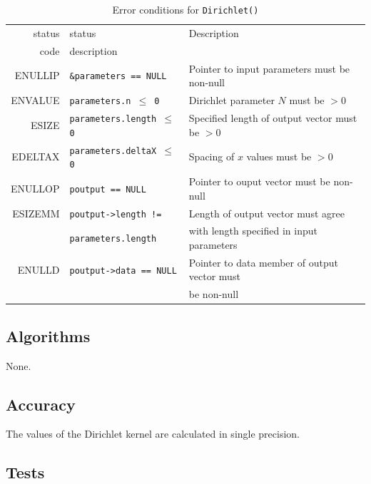 \documentclass{article}
\begin{document}
\begin{table}
\begin{center}
\begin{tabular}{|r|l|l|}\hline
status & status & Description\\
code   & description &\\
\hline
ENULLIP	& {\tt \&parameters == NULL\/} 
& Pointer to input parameters must be non-null\\
ENVALUE & {\tt parameters.n $\le$ 0} 
& Dirichlet parameter $N$ must be $>0$\\
ESIZE & {\tt parameters.length $\le$ 0} 
& Specified length of output vector must be $>0$\\
EDELTAX & {\tt parameters.deltaX $\le$ 0} 
& Spacing of $x$ values must be $>0$\\
ENULLOP & {\tt poutput == NULL\/}
& Pointer to ouput vector must be non-null\\
ESIZEMM & {\tt poutput->length !=\/}
& Length of output vector must agree\\
& {\tt parameters.length\/} 
& with length specified in input parameters\\
ENULLD & {\tt poutput->data == NULL\/}
& Pointer to data member of output vector must\\
&& be non-null\\
\hline
\end{tabular}
\end{center}
%
\caption{Error conditions for {\tt Dirichlet()\/}}
\label{tbl:Errors}
\end{table}
                                
\subsection{Algorithms}


None.

\subsection{Accuracy}


The values of the Dirichlet kernel are calculated in single precision.

\subsection{Tests}
\end{document}
